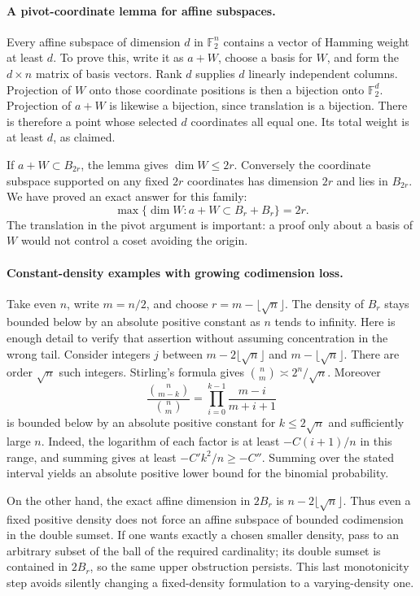 \documentclass[11pt,a4paper]{article}
\newcommand{\F}{\mathbb{F}}
\begin{document}
\paragraph{A pivot-coordinate lemma for affine subspaces.}
Every affine subspace of dimension $d$ in $\F_2^n$ contains a vector of Hamming weight at least $d$. To prove this, write it as $a+W$, choose a basis for $W$, and form the $d\times n$ matrix of basis vectors. Rank $d$ supplies $d$ linearly independent columns. Projection of $W$ onto those coordinate positions is then a bijection onto $\F_2^d$. Projection of $a+W$ is likewise a bijection, since translation is a bijection. There is therefore a point whose selected $d$ coordinates all equal one. Its total weight is at least $d$, as claimed.

If $a+W\subset B_{2r}$, the lemma gives $\dim W\leq2r$. Conversely the coordinate subspace supported on any fixed $2r$ coordinates has dimension $2r$ and lies in $B_{2r}$. We have proved an exact answer for this family:
\[
 \max\{\dim W:a+W\subset B_r+B_r\}=2r.
\]
The translation in the pivot argument is important: a proof only about a basis of $W$ would not control a coset avoiding the origin.

\paragraph{Constant-density examples with growing codimension loss.}
Take even $n$, write $m=n/2$, and choose $r=m-\lfloor\sqrt n\rfloor$. The density of $B_r$ stays bounded below by an absolute positive constant as $n$ tends to infinity. Here is enough detail to verify that assertion without assuming concentration in the wrong tail. Consider integers $j$ between $m-2\lfloor\sqrt n\rfloor$ and $m-\lfloor\sqrt n\rfloor$. There are order $\sqrt n$ such integers. Stirling's formula gives $\binom n m\asymp2^n/\sqrt n$. Moreover
\[
 \frac{\binom n{m-k}}{\binom n m}
 =\prod_{i=0}^{k-1}\frac{m-i}{m+i+1}
\]
is bounded below by an absolute positive constant for $k\leq2\sqrt n$ and sufficiently large $n$. Indeed, the logarithm of each factor is at least $-C(i+1)/n$ in this range, and summing gives at least $-C'k^2/n\geq-C''$. Summing over the stated interval yields an absolute positive lower bound for the binomial probability.

On the other hand, the exact affine dimension in $2B_r$ is $n-2\lfloor\sqrt n\rfloor$. Thus even a fixed positive density does not force an affine subspace of bounded codimension in the double sumset. If one wants exactly a chosen smaller density, pass to an arbitrary subset of the ball of the required cardinality; its double sumset is contained in $2B_r$, so the same upper obstruction persists. This last monotonicity step avoids silently changing a fixed-density formulation to a varying-density one.
\end{document}
